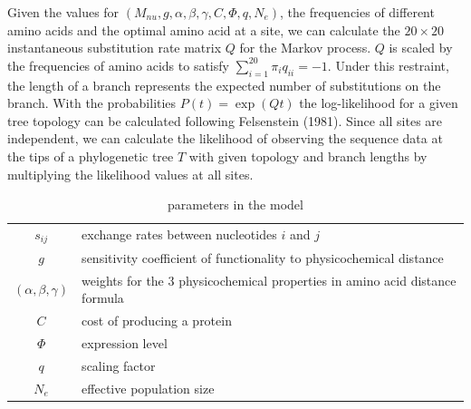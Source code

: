\documentclass[13pt]{article}
\begin{document}
Given the values for $(M_{nu},g, \alpha, \beta, \gamma, C, \Phi, q, N_e)$, the frequencies of different amino acids and the optimal amino acid at a site, we can calculate the $20 \times 20$ instantaneous substitution rate matrix $Q$ for the Markov process. $Q$ is scaled by the frequencies of amino acids to satisfy $\sum_{i=1}^{20} \pi_i q_{ii}= -1$. Under this restraint, the length of a branch represents the expected number of substitutions on the branch. With the probabilities $P(t)  = \exp(Qt)$ the log-likelihood for a given tree topology can be calculated following Felsenstein (1981). Since all sites are independent, we can calculate the likelihood of observing the sequence data at the tips of a phylogenetic tree $T$ with given topology and branch lengths by multiplying the likelihood values at all sites.\\

\begin{table}[h]
\centering
\caption{parameters in the model}
\begin{tabular}{ c p{6cm} }
\hline
$s_{ij}$ & exchange rates between nucleotides $i$ and $j$ \\
$g$       & sensitivity coefficient of functionality to physicochemical distance \\
$(\alpha,\beta,\gamma)$ & weights for the 3 physicochemical properties in amino acid distance formula \\
$C$ & cost of producing a protein\\
$\Phi$ & expression level \\
$q$ & scaling factor \\
$N_e$ & effective population size \\
\hline
\end{tabular}

\label{tb: para}
\end{table}
\end{document}

